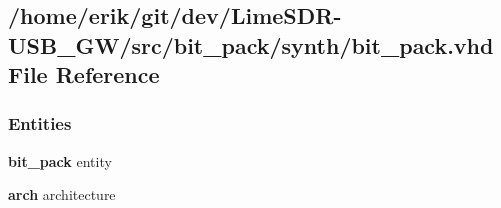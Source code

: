 \subsection{/home/erik/git/dev/\+Lime\+S\+D\+R-\/\+U\+S\+B\+\_\+\+G\+W/src/bit\+\_\+pack/synth/bit\+\_\+pack.vhd File Reference}
\label{bit__pack_2synth_2bit__pack_8vhd}
\subsubsection*{Entities}
\begin{DoxyCompactItemize}
\item 
{\bf bit\+\_\+pack} entity
\item 
{\bf arch} architecture
\end{DoxyCompactItemize}
